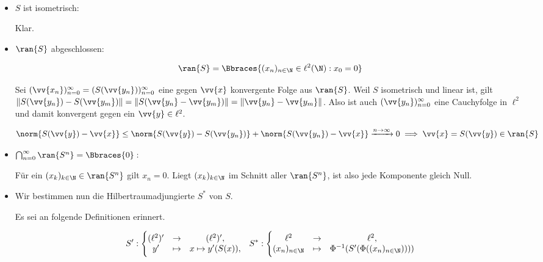 \begin{solution}

\leavevmode \\

\begin{itemize}

  \item
  $S$ ist isometrisch:

  Klar.

  \item
  $\ran{S}$ abgeschlossen:

  \begin{align*}
    \ran{S}
    =
    \Bbraces
    {
      (x_n)_{n \in \N} \in \ell^2(\N):
      x_0 = 0
    }
  \end{align*}

  Sei $(\vv{x_n})_{n=0}^\infty = (S(\vv{y_n}))_{n=0}^\infty$ eine gegen $\vv{x}$ konvergente Folge aus $\ran{S}$.
  Weil $S$ isometrisch und linear ist, gilt $\| S(\vv{y_n}) - S(\vv{y_m})\| = \| S(\vv{y_n} - \vv{y_m}) \| = \| \vv{y_n} - \vv{y_m} \|$.
  Also ist auch $(\vv{y_n})_{n=0}^\infty$ eine Cauchyfolge in $\ell^2$ und damit konvergent gegen ein $\vv{y} \in \ell^2$.

  \begin{align*}
    \norm{S(\vv{y}) - \vv{x}}
    \leq
    \norm{S(\vv{y}) - S(\vv{y_n})} +
    \norm{S(\vv{y_n}) - \vv{x}}
    \xrightarrow{n \to \infty} 0
    \implies
    \vv{x} = S(\vv{y}) \in \ran{S}
  \end{align*}

  \item
  $\bigcap_{n=0}^\infty \ran{S^n} = \Bbraces{0}:$

  Für ein $(x_k)_{k \in \N} \in \ran{S^n}$ gilt $x_n = 0$.
  Liegt $(x_k)_{k \in \N}$ im Schnitt aller $\ran{S^n}$, ist also jede Komponente gleich Null.

  \item
  Wir bestimmen nun die Hilbertraumadjungierte $S^\ast$ von $S$.

  Es sei an folgende Definitionen erinnert.

  \begin{align*}
    S^\prime: \Bigg \{
    \begin{matrix}
      (\ell^2)^\prime &
      \to             &
      (\ell^2)^\prime, \\
      y^\prime        &
      \mapsto         &
      x \mapsto y^\prime(S(x)),
    \end{matrix}
    \quad
    S^\ast: \Bigg \{
    \begin{matrix}
      \ell^2           &
      \to              &
      \ell^2, \\
      (x_n)_{n \in \N} &
      \mapsto          &
      \Phi^{-1}(S^\prime(\Phi((x_n)_{n \in \N}))))
    \end{matrix}
  \end{align*}


\end{itemize}
\end{solution}
